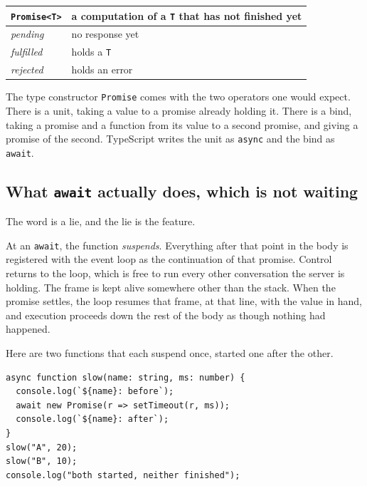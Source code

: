 \documentclass[11pt,a4paper]{article}
\begin{document}
\begin{center}\small
\begin{tabular}{@{}ll@{}}
\toprule
\texttt{Promise<T>} & a computation of a \texttt{T} that has not finished yet \\
\midrule
\emph{pending}   & no response yet \\
\emph{fulfilled} & holds a \texttt{T} \\
\emph{rejected}  & holds an error \\
\bottomrule
\end{tabular}
\end{center}

\begin{sectionbox}
The type constructor \texttt{Promise} comes with the two operators one would expect. There is a
unit, taking a value to a promise already holding it. There is a bind, taking a promise and a
function from its value to a second promise, and giving a promise of the second. TypeScript writes
the unit as \texttt{async} and the bind as \texttt{await}.
\end{sectionbox}

\subsection{What \texttt{await} actually does, which is not waiting}
\label{sec:awaitreally}

The word is a lie, and the lie is the feature.

At an \texttt{await}, the function \emph{suspends}. Everything after that point in the body is
registered with the event loop as the continuation of that promise. Control returns to the loop,
which is free to run every other conversation the server is holding. The frame is kept alive
somewhere other than the stack. When the promise settles, the loop resumes that frame, at that
line, with the value in hand, and execution proceeds down the rest of the body as though nothing
had happened.

\newpage

Here are two functions that each suspend once, started one after the other.

\begin{lstlisting}[language=TS]
async function slow(name: string, ms: number) {
  console.log(`${name}: before`);
  await new Promise(r => setTimeout(r, ms));
  console.log(`${name}: after`);
}
slow("A", 20);
slow("B", 10);
console.log("both started, neither finished");
\end{lstlisting}
\end{document}
